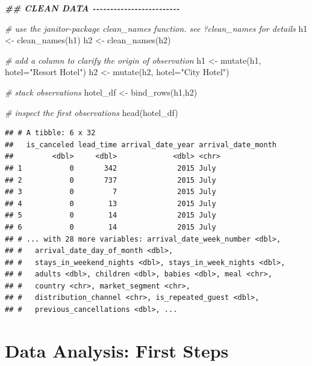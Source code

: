 \documentclass[
  12pt,
]{style/krantz}
\newenvironment{Shaded}{\begin{snugshade}}{\end{snugshade}}
\newcommand{\AttributeTok}[1]{\textcolor[rgb]{0.77,0.63,0.00}{#1}}
\newcommand{\CommentTok}[1]{\textcolor[rgb]{0.56,0.35,0.01}{\textit{#1}}}
\newcommand{\DocumentationTok}[1]{\textcolor[rgb]{0.56,0.35,0.01}{\textbf{\textit{#1}}}}
\newcommand{\FunctionTok}[1]{\textcolor[rgb]{0.00,0.00,0.00}{#1}}
\newcommand{\NormalTok}[1]{#1}
\newcommand{\OtherTok}[1]{\textcolor[rgb]{0.56,0.35,0.01}{#1}}
\newcommand{\StringTok}[1]{\textcolor[rgb]{0.31,0.60,0.02}{#1}}
\begin{document}
\begin{Shaded}
\begin{Highlighting}[]
\DocumentationTok{\#\# CLEAN DATA {-}{-}{-}{-}{-}{-}{-}{-}{-}{-}{-}{-}{-}{-}{-}{-}{-}{-}{-}{-}{-}{-}{-}{-}{-}}

\CommentTok{\# use the janitor{-}package clean\_names function. see ?clean\_names for details}
\NormalTok{h1 }\OtherTok{\textless{}{-}} \FunctionTok{clean\_names}\NormalTok{(h1)}
\NormalTok{h2 }\OtherTok{\textless{}{-}} \FunctionTok{clean\_names}\NormalTok{(h2)}

\CommentTok{\# add a column to clarify the origin of observation}
\NormalTok{h1 }\OtherTok{\textless{}{-}} \FunctionTok{mutate}\NormalTok{(h1, }\AttributeTok{hotel=}\StringTok{"Resort Hotel"}\NormalTok{)}
\NormalTok{h2 }\OtherTok{\textless{}{-}} \FunctionTok{mutate}\NormalTok{(h2, }\AttributeTok{hotel=}\StringTok{"City Hotel"}\NormalTok{)}

\CommentTok{\# stack observations}
\NormalTok{hotel\_df }\OtherTok{\textless{}{-}} \FunctionTok{bind\_rows}\NormalTok{(h1,h2)}

\CommentTok{\# inspect the first observations}
\FunctionTok{head}\NormalTok{(hotel\_df)}
\end{Highlighting}
\end{Shaded}

\begin{verbatim}
## # A tibble: 6 x 32
##   is_canceled lead_time arrival_date_year arrival_date_month
##         <dbl>     <dbl>             <dbl> <chr>             
## 1           0       342              2015 July              
## 2           0       737              2015 July              
## 3           0         7              2015 July              
## 4           0        13              2015 July              
## 5           0        14              2015 July              
## 6           0        14              2015 July              
## # ... with 28 more variables: arrival_date_week_number <dbl>,
## #   arrival_date_day_of_month <dbl>,
## #   stays_in_weekend_nights <dbl>, stays_in_week_nights <dbl>,
## #   adults <dbl>, children <dbl>, babies <dbl>, meal <chr>,
## #   country <chr>, market_segment <chr>,
## #   distribution_channel <chr>, is_repeated_guest <dbl>,
## #   previous_cancellations <dbl>, ...
\end{verbatim}

\hypertarget{data-analysis-first-steps}{%
\chapter{Data Analysis: First Steps}\label{data-analysis-first-steps}}
\end{document}
